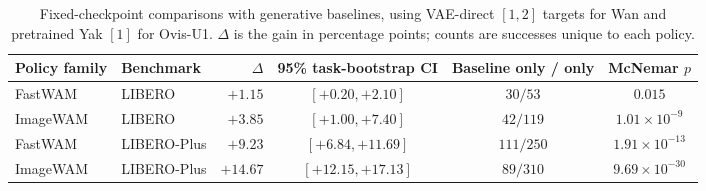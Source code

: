 \begin{table}[htbp]
\vspace{-4mm}
\caption{Fixed-checkpoint comparisons with generative baselines, using VAE-direct $[1,2]$ targets for Wan and pretrained Yak $[1]$ for Ovis-U1. $\Delta$ is the gain in percentage points; counts are successes unique to each policy.}
\vspace{2mm}
\label{tab:pairedstats}
\centering
\footnotesize
\setlength{\tabcolsep}{4pt}
\begin{tabular}{@{}llrccc@{}}
\toprule
Policy family & Benchmark & $\Delta$ & 95\% task-bootstrap CI & Baseline only / \modelname{} only & McNemar $p$ \\
\midrule
FastWAM & LIBERO & $+1.15$ & $[+0.20,+2.10]$ & $30/53$ & $0.015$ \\
ImageWAM & LIBERO & $+3.85$ & $[+1.00,+7.40]$ & $42/119$ & $1.01\!\times\!10^{-9}$ \\
FastWAM & LIBERO-Plus & $+9.23$ & $[+6.84,+11.69]$ & $111/250$ & $1.91\!\times\!10^{-13}$ \\
ImageWAM & LIBERO-Plus & $+14.67$ & $[+12.15,+17.13]$ & $89/310$ & $9.69\!\times\!10^{-30}$ \\
\bottomrule
\end{tabular}
\vspace{-2mm}
\end{table}
